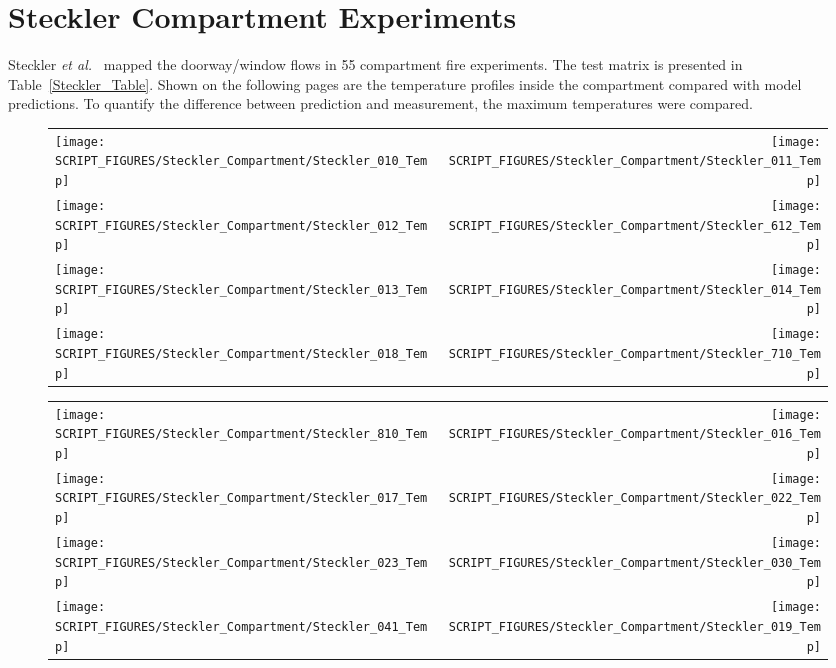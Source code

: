 \clearpage

\section{Steckler Compartment Experiments}

Steckler {\em et al.}~\cite{Steckler:1982} mapped the doorway/window flows in 55 compartment fire experiments. The test matrix is presented in Table~\ref{Steckler_Table}. Shown on the following pages are the temperature profiles inside the compartment compared with model predictions. To quantify the difference between prediction and measurement, the maximum temperatures were compared.



\begin{figure}[p]
\begin{tabular*}{\textwidth}{l@{\extracolsep{\fill}}r}
\texttt{[image: SCRIPT\_FIGURES/Steckler\_Compartment/Steckler\_010\_Temp]} &
\texttt{[image: SCRIPT\_FIGURES/Steckler\_Compartment/Steckler\_011\_Temp]} \\
\texttt{[image: SCRIPT\_FIGURES/Steckler\_Compartment/Steckler\_012\_Temp]} &
\texttt{[image: SCRIPT\_FIGURES/Steckler\_Compartment/Steckler\_612\_Temp]} \\
\texttt{[image: SCRIPT\_FIGURES/Steckler\_Compartment/Steckler\_013\_Temp]} &
\texttt{[image: SCRIPT\_FIGURES/Steckler\_Compartment/Steckler\_014\_Temp]} \\
\texttt{[image: SCRIPT\_FIGURES/Steckler\_Compartment/Steckler\_018\_Temp]} &
\texttt{[image: SCRIPT\_FIGURES/Steckler\_Compartment/Steckler\_710\_Temp]}
\end{tabular*}
\label{Steckler_Temp_1}
\end{figure}

\begin{figure}[p]
\begin{tabular*}{\textwidth}{l@{\extracolsep{\fill}}r}
\texttt{[image: SCRIPT\_FIGURES/Steckler\_Compartment/Steckler\_810\_Temp]} &
\texttt{[image: SCRIPT\_FIGURES/Steckler\_Compartment/Steckler\_016\_Temp]} \\
\texttt{[image: SCRIPT\_FIGURES/Steckler\_Compartment/Steckler\_017\_Temp]} &
\texttt{[image: SCRIPT\_FIGURES/Steckler\_Compartment/Steckler\_022\_Temp]} \\
\texttt{[image: SCRIPT\_FIGURES/Steckler\_Compartment/Steckler\_023\_Temp]} &
\texttt{[image: SCRIPT\_FIGURES/Steckler\_Compartment/Steckler\_030\_Temp]} \\
\texttt{[image: SCRIPT\_FIGURES/Steckler\_Compartment/Steckler\_041\_Temp]} &
\texttt{[image: SCRIPT\_FIGURES/Steckler\_Compartment/Steckler\_019\_Temp]}
\end{tabular*}
\label{Steckler_Temp_2}
\end{figure}

